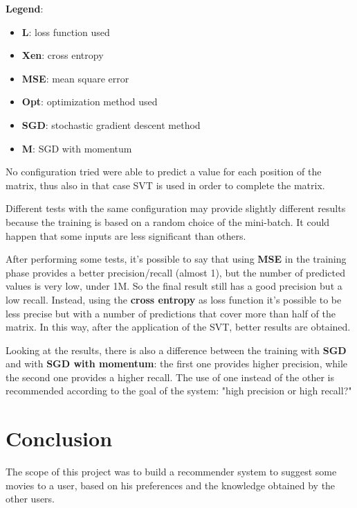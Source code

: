 \documentclass{article}
\begin{document}
\textbf{Legend}:
    \begin{itemize}
        \item \textbf{L}: loss function used
        \item \textbf{Xen}: cross entropy
        \item \textbf{MSE}: mean square error
        \item \textbf{Opt}: optimization method used
        \item \textbf{SGD}: stochastic gradient descent method
        \item \textbf{M}: SGD with momentum
    \end{itemize}

No configuration tried were able to predict a value for each position of the matrix, thus also in that case SVT is used in order to complete the matrix.\newline

Different tests with the same configuration may provide slightly different results because the training is based on a random choice of the mini-batch. It could happen that some inputs are less significant than others.\newline

After performing some tests, it's possible to say that using \textbf{MSE} in the training phase provides a better precision/recall (almost 1), but the number of predicted values is very low, under 1M. So the final result still has a good precision but a low recall. Instead, using the \textbf{cross entropy} as loss function it's possible to be less precise but with a number of predictions that cover more than half of the matrix. In this way, after the application of the SVT, better results are obtained.\newline

Looking at the results, there is also a difference between the training with \textbf{SGD} and with \textbf{SGD with momentum}: the first one provides higher precision, while the second one provides a higher recall. The use of one instead of the other is recommended according to the goal of the system: "high precision or high recall?"\newline


\section{Conclusion}
The scope of this project was to build a recommender system to suggest some movies to a user, based on his preferences and the knowledge obtained by the other users.
\end{document}
